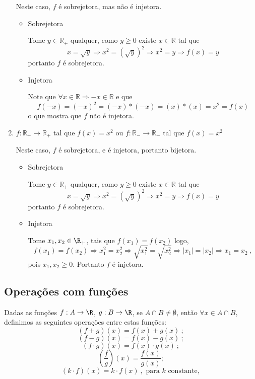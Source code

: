 \begin{exem}
\begin{enumerate}
  Neste caso, $f$ é sobrejetora, mas não é injetora.

  \begin{dem}
   \begin{itemize}
    \item Sobrejetora

    Tome $y \in \mathbb{R_{+}}$ qualquer, como $y \geq 0$ existe $x \in \mathbb{R}$ tal que
    \[x = \sqrt{y} \Rightarrow x^2 = (\sqrt{y})^2 \Rightarrow x^2 = y \Rightarrow f(x) = y \]
    portanto $f$ é sobrejetora.
    \fim
    \item Injetora

    Note que $ \forall x \in \mathbb{R} \Rightarrow -x \in \mathbb{R}$ e que
    \[f(-x)= (-x)^2 = (-x)*(-x) = (x)*(x) = x^2 = f(x)\]
    o que mostra que $f$ não é injetora.

   \end{itemize}
  \end{dem}

  \item $f: \mathbb{R_{+}} \rightarrow \mathbb{R_{+}}$ tal que $f(x) = x^2$ ou $f: \mathbb{R_{-}} \rightarrow \mathbb{R_{+}}$ tal que $f(x) = x^2$

  Neste caso, $f$ é sobrejetora, e é injetora, portanto bijetora.

  \begin{dem}
   \begin{itemize}
    \item Sobrejetora

    Tome $y \in \mathbb{R_{+}}$ qualquer, como $y \geq 0$ existe $x \in \mathbb{R}$ tal que
    \[x = \sqrt{y} \Rightarrow x^2 = (\sqrt{y})^2 \Rightarrow x^2 = y \Rightarrow f(x) = y\]
    portanto $f$ é sobrejetora.
    \fim
    \item Injetora

    Tome $x_1, x_2 \in \R_{+}$, tais que $f(x_1) = f(x_2)$ logo,
    \[f(x_1) = f(x_2) \Rightarrow x_1^2= x_2^2 \Rightarrow \sqrt{x_1^2}= \sqrt{x_2^2} \Rightarrow |x_1|= |x_2| \Rightarrow x_1= x_2 \ , \]
    pois $x_1, x_2 \geqslant 0$. Portanto $f$ é injetora.

   \end{itemize}
  \end{dem}

 \end{enumerate}

\end{exem}

\subsection{Operações com funções}
Dadas as funções $f: A \rightarrow \R$, $g: B \rightarrow \R$, se $A \cap B \neq \emptyset$, então $\forall x \in A \cap B$, definimos as seguintes operações entre estas funções:
\[(f + g)(x)= f(x) + g(x) \ ; \]
\[(f - g)(x)= f(x) - g(x) \ ; \]
\[(f \cdot g)(x)= f(x) \cdot g(x) \ ; \]
\[ \left( \frac{f}{g} \right) (x)= \frac{f(x)}{g(x)} ;\]
\[(k \cdot f)(x)= k \cdot f(x) \ , \text{ para } k \text{ constante} ,\]

